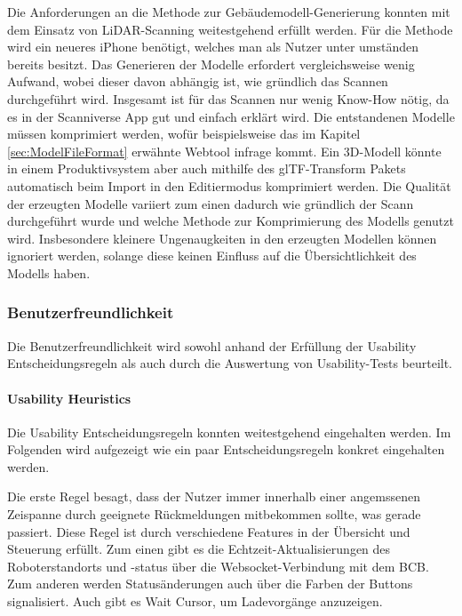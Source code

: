 Die Anforderungen an die Methode zur Gebäudemodell-Generierung konnten mit dem Einsatz von \ac{LiDAR}-Scanning weitestgehend erfüllt werden. Für die Methode wird ein neueres iPhone benötigt, welches man als Nutzer unter umständen bereits besitzt. Das Generieren der Modelle erfordert vergleichsweise wenig Aufwand, wobei dieser davon abhängig ist, wie gründlich das Scannen durchgeführt wird. Insgesamt ist für das Scannen nur wenig Know-How nötig, da es in der Scanniverse App gut und einfach erklärt wird. Die entstandenen Modelle müssen komprimiert werden, wofür beispielsweise das im Kapitel \ref{sec:ModelFileFormat} erwähnte Webtool infrage kommt. Ein 3D-Modell könnte in einem Produktivsystem aber auch mithilfe des \ac{glTF}-Transform Pakets \cite{glTF-Transform} automatisch beim Import in den Editiermodus komprimiert werden. Die Qualität der erzeugten Modelle variiert zum einen dadurch wie gründlich der Scann durchgeführt wurde und welche Methode zur Komprimierung des Modells genutzt wird. Insbesondere kleinere Ungenaugkeiten in den erzeugten Modellen können ignoriert werden, solange diese keinen Einfluss auf die Übersichtlichkeit des Modells haben.

\subsubsection{Benutzerfreundlichkeit}
Die Benutzerfreundlichkeit wird sowohl anhand der Erfüllung der Usability Entscheidungsregeln als auch durch die Auswertung von Usability-Tests beurteilt.

\paragraph{Usability Heuristics}\label{sec:UsabilityHeuristics}
Die Usability Entscheidungsregeln konnten weitestgehend eingehalten werden. Im Folgenden wird aufgezeigt wie ein paar Entscheidungsregeln konkret eingehalten werden.

Die erste Regel besagt, dass der Nutzer immer innerhalb einer angemssenen Zeispanne durch geeignete Rückmeldungen mitbekommen sollte, was gerade passiert. Diese Regel ist durch verschiedene Features in der Übersicht und Steuerung erfüllt. Zum einen gibt es die Echtzeit-Aktualisierungen des Roboterstandorts und -status über die \gls{Websocket}-Verbindung mit dem \ac{BCB}. Zum anderen werden Statusänderungen auch über die Farben der Buttons signalisiert. Auch gibt es Wait Cursor, um Ladevorgänge anzuzeigen.


